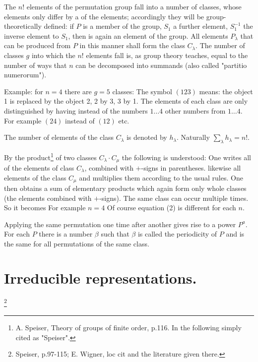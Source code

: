 \begin{paper}{1}
The $n!$ elements of the permutation group fall into a number of classes, whose elements only differ by a  of the elements; accordingly they will be group-theoretically defined: if $P$ is a member of the group, $S_1$ a further element, $S_1^{-1}$ the inverse element to $S_1$, then
is again an element of the group. All elements $P_\lambda$ that can be produced from $P$ in this manner shall form the class $C_\lambda$. The number of classes $g$ into which the $n!$ elements fall is, as group theory teaches, equal to the number of ways that $n$ can be decomposed into summands (also called "partitio numerorum").

Example: for $n=4$ there are $g=5$ classes:
The symbol $(123)$ means: the object 1 is replaced by the object 2, 2 by 3, 3 by 1. The elements of each class are only distinguished by having instead of the numbers $1\dots 4$ other numbers from $1\dots 4$. For example $(24)$ instead of $(12)$ etc.

The number of elements of the class $C_\lambda$ is denoted by $h_\lambda$. Naturally $\sum\limits_\lambda h_\lambda = n!$.

By the product\footnote{A. Speiser, Theory of groups of finite order, p.116. In the following simply cited as "Speiser".} of two classes $C_\lambda \cdot C_\mu$ the following is understood: One writes all of the elements of class $C_\lambda$, combined with $+$-signs in parentheses.
likewise all elements of the class $C_\mu$
and multiplies them according to the usual rules. One then obtains a sum of elementary products
which again form only whole classes (the elements combined with $+$-signs). The same class can occur multiple times. So it becomes
For example $n=4$
Of course equation (2) is different for each $n$.

Applying the same permutation one time after another gives rise to a power $P^a$. For each $P$ there is a number $\beta$ such that
$\beta$ is called the periodicity of $P$ and is the same for all permutations of the same class.

\section{Irreducible representations.}\footnote{Speiser, p.97-115; E. Wigner, loc cit and the literature given there.}


\end{paper}
